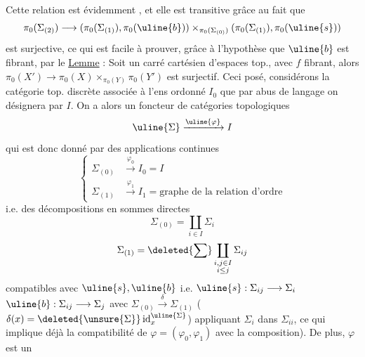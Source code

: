  Cette relation est évidemment , et
elle est transitive grâce au fait que
\[
\pi_0(\Sigma_{(2)})\longrightarrow
(\pi_0(\Sigma_{(1)}),\pi_0(\uline{b}))\times_{\pi_0(\Sigma_{(0)})}
(\pi_0(\Sigma_{(1)}),\pi_0(\uline{s}))
\]
est surjective, ce qui est facile à prouver,
grâce à l'hypothèse que $\uline{b}$ est fibrant, par le
\uline{Lemme} : Soit
un carré
cartésien d'espaces top., avec $f$ fibrant,
alors $\pi_0(X')\longrightarrow\pi_0(X)\times_{\pi_0(Y)}\pi_0(Y')$ est surjectif.
Ceci posé, considérons la catégorie top. discrète associée
à l'ens ordonné $I_0$ que par abus de langage
on désignera par $I$. On a alors un foncteur
 de catégories topologiques 
\[
\uline{\Sigma}\xrightarrow{\uline{\varphi}}I
\]
qui est donc donné par des applications continues
\[
\left\{\begin{aligned}
\Sigma_{(0)}&\xrightarrow{\varphi_0}I_0=I\\
\Sigma_{(1)}&\xrightarrow{\varphi_1}I_1=\text{graphe de la relation d'ordre}
\end{aligned}\right.
\]
i.e. des décompositions en sommes directes
\[
\Sigma_{(0)}=\coprod_{i\in I}\Sigma_i
\]
\[
\Sigma_{(1)}=\deleted{\sum}\coprod_{\substack{i,j\in I\\i\leq j}}\Sigma_{ij}
\]
compatibles avec $\uline{s},\uline{b}$
i.e. $\uline{s}:\Sigma_{ij}\longrightarrow\Sigma_i$
$\uline{b}:\Sigma_{ij}\longrightarrow\Sigma_j$
avec $\Sigma_{(0)}\xrightarrow{\delta}\Sigma_{(1)}$ ($\delta(x)=\deleted{\unsure{\Sigma}}\operatorname{id}^{\uline{\Sigma}}_x$)
appliquant $\Sigma_i$ dans $\Sigma_{ii}$,  ce qui
implique déjà la compatibilité de $\varphi=(\varphi_0,\varphi_1)$ avec
la composition). De plus, $\varphi$ est un

